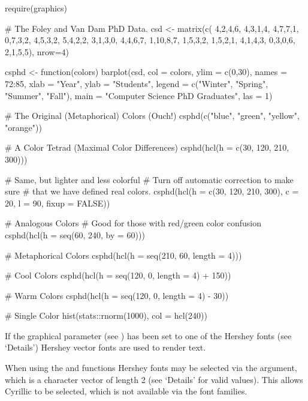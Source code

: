 \begin{Examples}
\begin{ExampleCode}
require(graphics)

# The Foley and Van Dam PhD Data.
csd <- matrix(c( 4,2,4,6, 4,3,1,4, 4,7,7,1,
                 0,7,3,2, 4,5,3,2, 5,4,2,2,
                 3,1,3,0, 4,4,6,7, 1,10,8,7,
                 1,5,3,2, 1,5,2,1, 4,1,4,3,
                 0,3,0,6, 2,1,5,5), nrow=4)

csphd <- function(colors)
  barplot(csd, col = colors, ylim = c(0,30),
          names = 72:85, xlab = "Year", ylab = "Students",
          legend = c("Winter", "Spring", "Summer", "Fall"),
          main = "Computer Science PhD Graduates", las = 1)

# The Original (Metaphorical) Colors (Ouch!)
csphd(c("blue", "green", "yellow", "orange"))

# A Color Tetrad (Maximal Color Differences)
csphd(hcl(h = c(30, 120, 210, 300)))

# Same, but lighter and less colorful
# Turn off automatic correction to make sure
# that we have defined real colors.
csphd(hcl(h = c(30, 120, 210, 300),
          c = 20, l = 90, fixup = FALSE))

# Analogous Colors
# Good for those with red/green color confusion
csphd(hcl(h = seq(60, 240, by = 60)))

# Metaphorical Colors
csphd(hcl(h = seq(210, 60, length = 4)))

# Cool Colors
csphd(hcl(h = seq(120, 0, length = 4) + 150))

# Warm Colors
csphd(hcl(h = seq(120, 0, length = 4) - 30))

# Single Color
hist(stats::rnorm(1000), col = hcl(240))
\end{ExampleCode}
\end{Examples}
%
\begin{Description}\relax
If the  graphical parameter (see )
has been set to one of the Hershey fonts (see `Details')
Hershey vector fonts are used to render text.

When using the  and  functions
Hershey fonts may be selected via the  argument, which is
a character vector of length 2 (see `Details' for valid
values).  This allows Cyrillic to be selected, which is not available
via the font families.
\end{Description}
